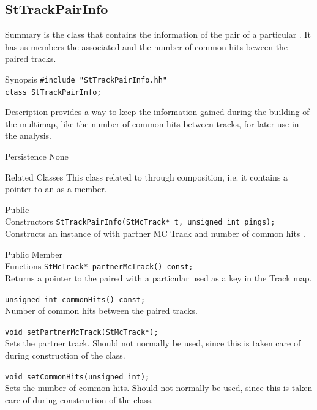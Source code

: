\subsection{StTrackPairInfo}
\label{sec:StTrackPairInfo}
\begin{Entry}
\item[Summary]
     is the class that contains the information of the pair of
    a particular . It has as members the associated
     and the number of common hits beween the paired tracks.

\item[Synopsis]
    \verb+#include "StTrackPairInfo.hh"+\\
    \verb+class StTrackPairInfo;+\\

\item[Description]
     provides a way to keep the information gained during the
    building of the multimap, like the number of common hits between tracks, for
    later use in the analysis.

\item[Persistence]
    None

\item[Related Classes]
    This class related to  through composition, i.e. it
    contains a pointer to an
     as a member. 
    
\item[Public\\ Constructors]
    \verb+StTrackPairInfo(StMcTrack* t, unsigned int pings);+\\
    Constructs an instance of  with partner MC Track  and
    number of common hits .

\item[Public Member\\ Functions]
    \verb+StMcTrack* partnerMcTrack() const;+\\
    Returns a pointer to the  paired with a particular  used
    as a key in the Track map.

    \verb+unsigned int commonHits() const;+\\
    Number of common hits between the paired tracks.

    \verb+void setPartnerMcTrack(StMcTrack*);+\\
    Sets the partner track.  Should not normally be used, since this is taken care of
    during construction of the class.

    \verb+void setCommonHits(unsigned int);+\\
    Sets the number of common hits.  Should not normally be used, since this is taken care of
    during construction of the class.

\end{Entry}

